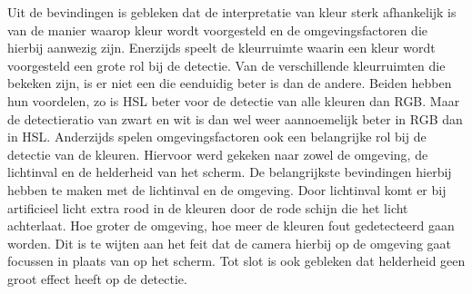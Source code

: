  
Uit de bevindingen is gebleken dat de interpretatie van kleur sterk afhankelijk is van de manier waarop kleur wordt voorgesteld en de omgevingsfactoren die hierbij aanwezig zijn. Enerzijds speelt de kleurruimte waarin een kleur wordt voorgesteld een grote rol bij de detectie. Van de verschillende kleurruimten die bekeken zijn, is er niet een die eenduidig beter is dan de andere. Beiden hebben hun voordelen, zo is HSL beter voor de detectie van alle kleuren dan RGB. Maar de detectieratio van zwart en wit is dan wel weer aannoemelijk beter in RGB dan in HSL.  Anderzijds spelen omgevingsfactoren ook een belangrijke rol bij de detectie van de kleuren. Hiervoor werd gekeken naar zowel de omgeving, de lichtinval en de helderheid van het scherm. De belangrijkste bevindingen hierbij hebben te maken met de lichtinval en de omgeving. Door lichtinval komt er bij artificieel licht extra rood in de kleuren door de rode schijn die het licht achterlaat. Hoe groter de omgeving, hoe meer de kleuren fout gedetecteerd gaan worden. Dit is te wijten aan het feit dat de camera hierbij op de omgeving gaat focussen in plaats van op het scherm. Tot slot is ook gebleken dat helderheid geen groot effect heeft op de detectie.